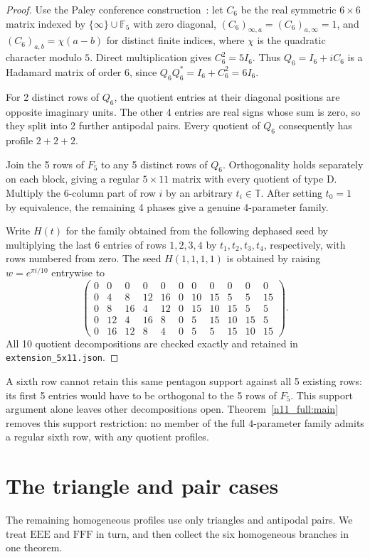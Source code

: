 \documentclass[11pt,a4paper]{article}
\theoremstyle{plain}
\theoremstyle{definition}
\theoremstyle{plain}
\begin{document}
\begin{proof}
Use the Paley conference construction~\cite{pal}: let $C_6$ be the real symmetric $6\times6$ matrix indexed by $\{\infty\}\cup\mathbb{F}_5$ with zero diagonal, $(C_6)_{\infty,a}=(C_6)_{a,\infty}=1$, and $(C_6)_{a,b}=\chi(a-b)$ for distinct finite indices, where $\chi$ is the quadratic character modulo $5$. Direct multiplication gives $C_6^2=5I_6$. Thus $Q_6=I_6+iC_6$ is a Hadamard matrix of order 6, since $Q_6Q_6^*=I_6+C_6^2=6I_6$.

For 2 distinct rows of $Q_6$, the quotient entries at their diagonal positions are opposite imaginary units. The other 4 entries are real signs whose sum is zero, so they split into 2 further antipodal pairs. Every quotient of $Q_6$ consequently has profile $2+2+2$.

Join the 5 rows of $F_5$ to any 5 distinct rows of $Q_6$. Orthogonality holds separately on each block, giving a regular $5\times11$ matrix with every quotient of type $\mathrm{D}$. Multiply the 6-column part of row $i$ by an arbitrary $t_i\in\mathbb{T}$. After setting $t_0=1$ by equivalence, the remaining 4 phases give a genuine 4-parameter family.

Write $H(t)$ for the family obtained from the following dephased seed by multiplying the last 6 entries of rows $1,2,3,4$ by $t_1,t_2,t_3,t_4$, respectively, with rows numbered from zero. The seed $H(1,1,1,1)$ is obtained by raising $w=e^{\pi i/10}$ entrywise to
$$\begin{pmatrix}
0&0&0&0&0&0&0&0&0&0&0\\
0&4&8&12&16&0&10&15&5&5&15\\
0&8&16&4&12&0&15&10&15&5&5\\
0&12&4&16&8&0&5&15&10&15&5\\
0&16&12&8&4&0&5&5&15&10&15
\end{pmatrix}.$$
All 10 quotient decompositions are checked exactly and retained in \texttt{extension\_5x11.json}.
\end{proof}

A sixth row cannot retain this same pentagon support against all 5 existing rows: its first 5 entries would have to be orthogonal to the 5 rows of $F_5$. This support argument alone leaves other decompositions open. Theorem~\ref{n11_full:main} removes this support restriction: no member of the full $4$-parameter family admits a regular sixth row, with any quotient profiles.

\section{The triangle and pair cases}\label{sec:triangles_pairs}
The remaining homogeneous profiles use only triangles and antipodal pairs. We treat $\mathrm{EEE}$ and $\mathrm{FFF}$ in turn, and then collect the six homogeneous branches in one theorem.
\end{document}
